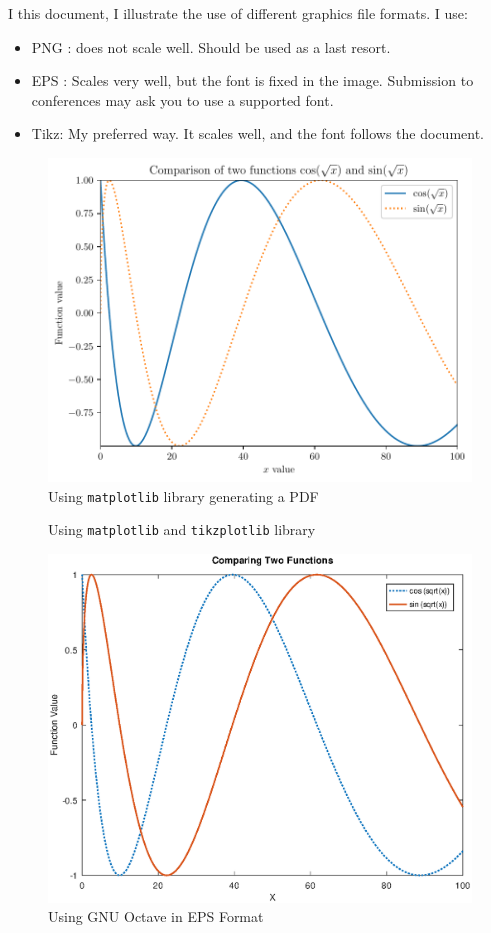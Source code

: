 
\renewcommand{\familydefault}{\sfdefault}
\usepackage{gnuplot-lua-tikz}


\maketitle
I this document, I illustrate the use of different graphics file formats. I use:
\begin{itemize}
  \item PNG : does not scale well. Should be used as a last resort.
  \item EPS : Scales very well, but the font is fixed in the image. Submission to conferences may ask you to use a supported font.
  \item Tikz: My preferred way. It scales well, and the font follows the document. 
\end{itemize}

\begin{figure}[H]
  \centering 
  \includegraphics[width=0.75\columnwidth]{figures/FunctionCompare.pdf}
  \caption {Using \texttt{matplotlib} library generating a PDF}
\end{figure}

\begin{figure}[H]
  \centering 
    
  \caption {Using \texttt{matplotlib} and \texttt{tikzplotlib} library}
\end{figure}

\begin{figure}[H]
  \centering 
  \includegraphics[width=0.75\columnwidth]{figures/OctaveEPS.eps}
  \caption {Using GNU Octave in EPS Format}
\end{figure}


